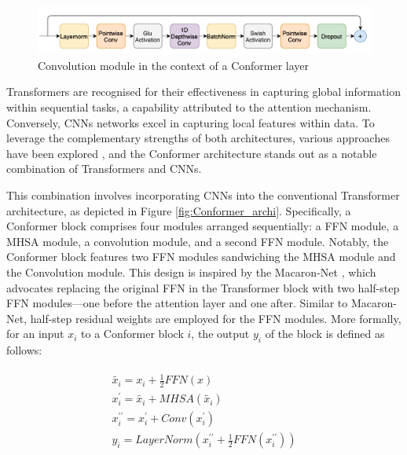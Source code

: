 \begin{figure}[h]
    \centering
    \includegraphics[width=1\textwidth]{imgs/ConvolutionModule.png}
    \caption{Convolution module in the context of a Conformer layer}
    \label{fig:convModule}
\end{figure}
Transformers are recognised for their effectiveness in capturing global information within sequential tasks, a capability attributed to the attention mechanism. Conversely, \acp{CNN} networks excel in capturing local features within data. To leverage the complementary strengths of both architectures, various approaches have been explored \cite{bello2019attention,yang2019convolutional}, and the Conformer architecture \cite{gulati2020conformer} stands out as a notable combination of Transformers and \acp{CNN}.

This combination involves incorporating \acp{CNN} into the conventional Transformer architecture, as depicted in Figure \ref{fig:Conformer_archi}. Specifically, a Conformer block comprises four modules arranged sequentially: a \ac{FFN} module, a \ac{MHSA} module, a convolution module, and a second \ac{FFN} module. Notably, the Conformer block features two \ac{FFN} modules sandwiching the \ac{MHSA} module and the Convolution module. This design is inspired by the Macaron-Net \cite{lu2019understanding}, which advocates replacing the original \ac{FFN} in the Transformer block with two half-step \ac{FFN} modules—one before the attention layer and one after. Similar to Macaron-Net, half-step residual weights are employed for the \ac{FFN} modules. More formally, for an input $x_i$ to a Conformer block $i$, the output $y_i$ of the block is defined as follows:


\begin{align}
    \begin{split}
    \tilde{x_i} = x_i + \frac{1}{2}FFN(x) \\
    x_i^{\prime} =\tilde{x_i} + MHSA(\tilde{x_i}) \\
    x_i^{\prime\prime} = x_i^{\prime} + Conv(x_i^{\prime}) \\
    y_i = LayerNorm(x_i^{\prime\prime} + \frac{1}{2}FFN(x_i^{\prime\prime}))
    \end{split}
\end{align}

